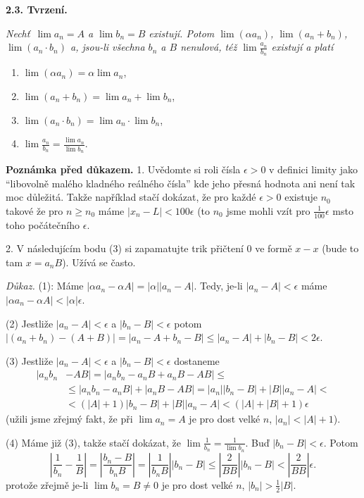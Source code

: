 \documentclass[12pt]{article}
\begin{document}
 \bigskip
 
 {\bf 2.3. Tvrzení.} {\em Nechť\ $\lim a_n=A$ a $\lim b_n=B$ existují. Potom $\lim(\alpha a_n)$, 
 $\lim(a_n+b_n)$, $\lim(a_n\cdot b_n)$ a, jsou-li všechna $b_n$ a $B$ nenulová, též $\lim\frac{a_n}{b_n}$ existují
a platí
 \begin{enumerate}
 \item $\lim(\alpha a_n)=\alpha\lim a_n$,
 \item $\lim(a_n+b_n)=\lim a_n+\lim b_n$,
 \item $\lim(a_n\cdot b_n)=\lim a_n\cdot\lim b_n$,
 \item $\lim\frac{a_n}{b_n}=\frac{\lim a_n}{\lim b_n}$.
 \end{enumerate} }
 
 \smallskip
 
 {\bf Poznámka před důkazem.} 1. Uvědomte si roli čísla $\epsilon>0$ v definici limity jako
 ``libovolně malého kladného reálného čísla'' kde jeho přesná hodnota ani není tak moc důležitá. Takže například stačí dokázat, že pro každé $\epsilon>0$ existuje $n_0$ takové že pro $n\geq n_0$ máme $|x_n-L|<100\epsilon$ (to  $n_0$ jsme mohli vzít pro $\frac1{100}\epsilon$ msto toho počátečního $\epsilon$. 
 
 2. V následujícím bodu (3) si zapamatujte trik přičtení $0$ ve formě $x-x$ (bude to tam $x=a_nB$). Užívá se často.
 
 \smallskip
 
 {\em Důkaz.} (1): Máme $|\alpha a_n-\alpha A|=|\alpha||a_n-A|$. Tedy, je-li $|a_n-A|<\epsilon$
máme $|\alpha a_n-\alpha A|<|\alpha|\epsilon$.
 
 (2) Jestliže $|a_n-A|<\epsilon$ a $|b_n-B|<\epsilon$ potom $|(a_n+b_n)-(A+B)|=|a_n-A+b_n-B|\leq
 |a_n-A|+|b_n-B|<2\epsilon$.
 
 (3) Jestliže $|a_n-A|<\epsilon$ a $|b_n-B|<\epsilon$ dostaneme
 $$
 \begin{aligned} 
 |a_nb_n&-AB|=|a_nb_n-a_nB+a_nB-AB|\leq\\
 &\leq |a_nb_n-a_nB|+|a_nB-AB|=
 |a_n||b_n-B|+|B||a_n-A|<\\
 &<
 (|A|+1)|b_n-B|+|B||a_n-A|<(|A|+|B|+1)\epsilon
 \end{aligned}
 $$
 (užili jsme zřejmý fakt, že při $\lim a_n=A$ je pro dost velké  $n$, $|a_n|<|A|+1$).
 
 (4) Máme již (3), takže stačí dokázat, že $\lim\frac{1}{b_n}=\frac{1}{\lim b_n}$. Buď
 $|b_n-B|<\epsilon$. Potom
 $$
 \left|\frac{1}{b_n}-\frac{1}{B}\right|=\left|\frac{b_n-B}{b_nB}\right|=\left|\frac1{b_nB}\right||b_n-B|\leq
\left|\frac2{BB}\right||b_n-B|<\left|\frac2{BB}\right|\epsilon.
 $$
protože zřejmě je-li $\lim b_n=B\neq 0$ je pro dost velké $n$, $|b_n|>\frac12 |B|$. \sq
 
\end{document}
